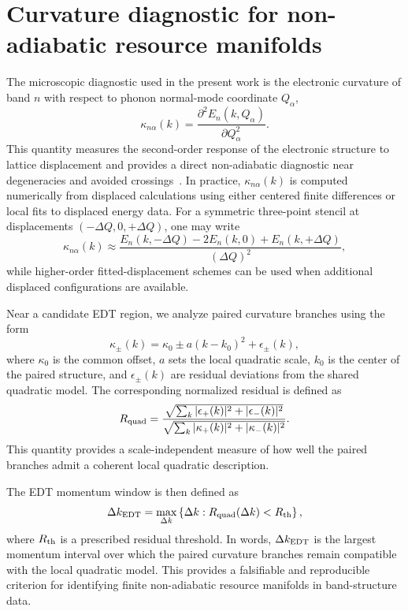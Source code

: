 \section{Curvature diagnostic for non-adiabatic resource manifolds}

The microscopic diagnostic used in the present work is the electronic curvature of band $n$ with respect to phonon normal-mode coordinate $Q_\alpha$,
\begin{equation}
\kappa_{n\alpha}(k)=\frac{\partial^2 E_n(k,Q_\alpha)}{\partial Q_\alpha^2}.
\end{equation}
This quantity measures the second-order response of the electronic structure to lattice displacement and provides a direct non-adiabatic diagnostic near degeneracies and avoided crossings~\cite{Mead1979,Yarkony1996,Giustino2017}. In practice, $\kappa_{n\alpha}(k)$ is computed numerically from displaced calculations using either centered finite differences or local fits to displaced energy data. For a symmetric three-point stencil at displacements $(-\Delta Q,0,+\Delta Q)$, one may write
\begin{equation}
\kappa_{n\alpha}(k)\approx
\frac{E_n(k,-\Delta Q)-2E_n(k,0)+E_n(k,+\Delta Q)}{(\Delta Q)^2},
\end{equation}
while higher-order fitted-displacement schemes can be used when additional displaced configurations are available.

Near a candidate EDT region, we analyze paired curvature branches using the form
\begin{equation}
\kappa_\pm(k)
=
\kappa_0
\pm a(k-k_0)^2
+
\epsilon_\pm(k),
\end{equation}
where $\kappa_0$ is the common offset, $a$ sets the local quadratic scale, $k_0$ is the center of the paired structure, and $\epsilon_\pm(k)$ are residual deviations from the shared quadratic model. The corresponding normalized residual is defined as
\begin{equation}
R_{\rm quad}
=
\frac{
\sqrt{\sum_k |\epsilon_+(k)|^2 + |\epsilon_-(k)|^2}
}{
\sqrt{\sum_k |\kappa_+(k)|^2 + |\kappa_-(k)|^2}
}.
\end{equation}
This quantity provides a scale-independent measure of how well the paired branches admit a coherent local quadratic description.

The EDT momentum window is then defined as
\begin{equation}
\Delta k_{\rm EDT}
=
\max_{\Delta k}
\left\{
\Delta k:
R_{\rm quad}(\Delta k)<R_{\rm th}
\right\},
\end{equation}
where $R_{\rm th}$ is a prescribed residual threshold. In words, $\Delta k_{\rm EDT}$ is the largest momentum interval over which the paired curvature branches remain compatible with the local quadratic model. This provides a falsifiable and reproducible criterion for identifying finite non-adiabatic resource manifolds in band-structure data.

